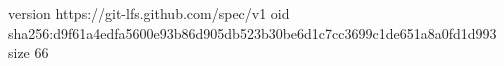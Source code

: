 version https://git-lfs.github.com/spec/v1
oid sha256:d9f61a4edfa5600e93b86d905db523b30be6d1c7cc3699c1de651a8a0fd1d993
size 66
